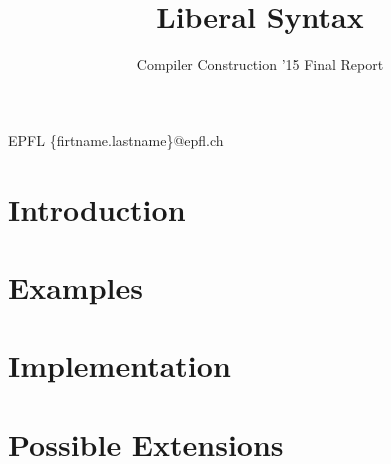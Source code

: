 \documentclass[nocopyrightspace,11pt,authoryear,preprint]{sigplanconf}
\begin{document}


\title{Liberal Syntax}
\subtitle{Compiler Construction '15 Final Report}

           {EPFL}
           {\{firtname.lastname\}@epfl.ch}

\maketitle

\section{Introduction}


\section{Examples}


\section{Implementation}


\section{Possible Extensions}


%
%
\end{document}
